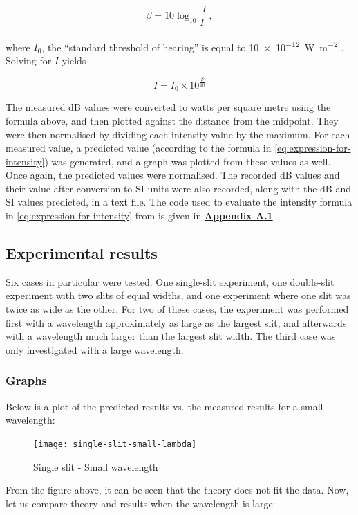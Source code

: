 \documentclass{paper}
\begin{document}
\begin{equation*}
    \beta = 10\log_{10}\frac{I}{I_0},
\end{equation*}
                
where $I_0$, the \enquote{standard threshold of hearing} is equal to \SI{10e-12}{\watt\per\square\m} \parencite{decibel-to-intensity}.
Solving for $I$ yields

\begin{equation}
\label{eq:intensity-to-decibel}
    I = I_{0} \times 10^{\frac{\beta}{10}}
\end{equation}

The measured dB values were converted to watts per square metre using the formula above,
and then plotted against the distance from the midpoint. They were then normalised by dividing each
intensity value by the maximum. For each measured value, a predicted value (according to the formula in 
\eqref{eq:expression-for-intensity}) was generated, and a graph was plotted from these values as well.
Once again, the predicted values were normalised. The recorded dB values and their value after conversion to
SI units were also recorded, along with the dB and SI values predicted, in a text file. The code used
to evaluate the intensity formula in \eqref{eq:expression-for-intensity} from  is given in \textbf{\hyperref[appendix:diffraction-free-code]{Appendix A.1}}

\subsection{Experimental results}
\label{section:experimental-results}
Six cases in particular were tested. One single-slit experiment, one double-slit
experiment with two slits of equal widths, and one experiment where one slit was twice
as wide as the other. For two of these cases, the experiment was performed first with
a wavelength approximately as large as the largest slit, and afterwards with a wavelength much
larger than the largest slit width. The third case was only investigated with a large wavelength.

\subsubsection{Graphs}
Below is a plot of the predicted results vs. the measured results for a small wavelength:

\begin{figure}[H]
\label{fig:single-slit-small-lambda}
\caption{Single slit - Small wavelength}    
    \texttt{[image: single-slit-small-lambda]}

\end{figure}
From the figure above, it can be seen that the theory does not fit the data.
Now, let us compare theory and results when the wavelength is large:
\end{document}
